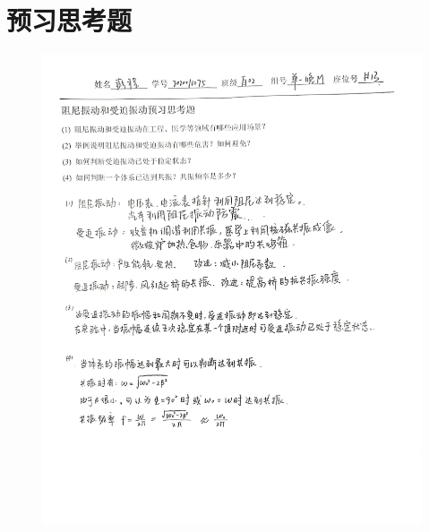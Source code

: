 \documentclass[UTF8]{ctexart}
\begin{document}
\section{预习思考题}
\begin{figure}[H]
    \centering
    \includegraphics[scale=0.13]{预习思考题.jpg}
\end{figure}
\end{document}
